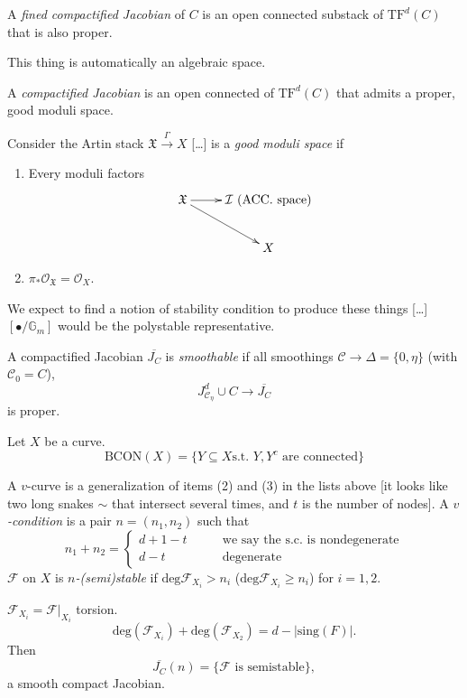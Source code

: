 \begin{definition}
\label{definition-fine-compactified-Jacobian}
A {\it fined compactified Jacobian} of $C$ is an open connected substack of
$\text{TF}^d(C)$ that is also proper.
\end{definition}

\begin{remark}
\label{remark-algebraic-space}
This thing is automatically an algebraic space.
\end{remark}

\begin{definition}
\label{definition-compactified-Jacobian}
A {\it compactified Jacobian} is an open connected of $\text{TF}^d(C)$ that
admits a proper, good moduli space.
\end{definition}

Consider the Artin stack $\mathfrak{X} \xrightarrow{\Gamma}X$ […]
 is a {\it good
moduli space} if 
\begin{enumerate}
\item Every moduli factors
$$
\xymatrix{
\mathfrak{X} \ar[r]\ar[rd]&\mathcal{I}\text{ (ACC. space)}\\
& X
}
$$
\item $\pi_*\mathcal{O}_{\mathfrak{X}}=\mathcal{O}_X$.
\end{enumerate}

\medskip\noindent
We expect to find a notion of stability condition to produce these things 
[…] $[\bullet/ \mathbb{G}_m]$ would be the polystable representative.

\begin{definition}
\label{definition-smoothable-compactified-Jacobian}
A compactified Jacobian $\overline{J_C}$ is {\it smoothable} if all smoothings 
$\mathcal{C}\to \Delta=\{0,\eta\}$ (with $\mathcal{C}_0=C$), 
$$
J^d_{\mathcal{C}_\eta}\cup C \to \overline{J_C}
$$
is proper.
\end{definition}

\medskip\noindent

\begin{definition}
\label{definition-connected}
Let $X$ be a curve.
$$
\text{BCON}(X)=\{Y \subseteq X\text{s.t. }Y,Y^c \text{ are connected}\}
$$
\end{definition}

\begin{definition}
\label{definition-v-satbility}
A $v$-curve is a generalization of items (2) and (3) in the lists above 
[it looks like two long snakes $\sim$ that intersect several times, and $t$ is
the number of nodes]. 
A {\it $v$-condition} is a pair $n=(n_1,n_2)$ such that 
$$
n_1+n_2=\begin{cases}
d+1-t\qquad &\text{we say the s.c. is nondegenerate} \\
d-t\qquad &\text{degenerate}
\end{cases}
$$
$\mathcal{F}$ on $X$ is  {\it $n$-(semi)stable} if 
$\text{deg}\mathcal{F}_{X_i}>n_i$ ($\text{deg}\mathcal{F}_{X_i}\geq n_i$) 
for $i=1,2$.
\end{definition}
$\mathcal{F}_{X_i}=\mathcal{F}|_{X_i}$ torsion.
$$
\text{deg}(\mathcal{F}_{X_i})+\text{deg}(\mathcal{F}_{X_2})
=d-|\text{sing}(F)|.
$$
Then 
$$
\overline{J_C}(n)=\{\mathcal{F}\text{ is semistable}\},
$$
a smooth compact Jacobian.

